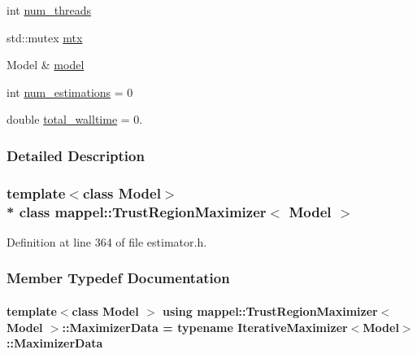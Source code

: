 \begin{DoxyCompactItemize}
\item 
int \hyperlink{classmappel_1_1ThreadedEstimator_a6afa05d7d971f3317ce1602de853123b}{num\+\_\+threads}
\item 
std\+::mutex \hyperlink{classmappel_1_1ThreadedEstimator_a4538fd0860243430bfd47e8064c8cfe4}{mtx}
\item 
Model \& \hyperlink{classmappel_1_1Estimator_a8322546d87ccdf01f8b0dcd9dae509f0}{model}
\item 
int \hyperlink{classmappel_1_1Estimator_ab15b88435d6c50a68fac84465d950b12}{num\+\_\+estimations} = 0
\item 
double \hyperlink{classmappel_1_1Estimator_a5a408458a111c5222193871fa6bb6644}{total\+\_\+walltime} = 0.
\end{DoxyCompactItemize}


\subsubsection{Detailed Description}
\subsubsection*{template$<$class Model$>$\\*
class mappel\+::\+Trust\+Region\+Maximizer$<$ Model $>$}



Definition at line 364 of file estimator.\+h.



\subsubsection{Member Typedef Documentation}
\paragraph[{\texorpdfstring{Maximizer\+Data}{MaximizerData}}]{\setlength{\rightskip}{0pt plus 5cm}template$<$class Model $>$ using {\bf mappel\+::\+Trust\+Region\+Maximizer}$<$ Model $>$\+::{\bf Maximizer\+Data} =  typename {\bf Iterative\+Maximizer}$<$Model$>$\+::{\bf Maximizer\+Data}}\hypertarget{classmappel_1_1TrustRegionMaximizer_a985b65b01842afcba340901554efa409}{}\label{classmappel_1_1TrustRegionMaximizer_a985b65b01842afcba340901554efa409}


